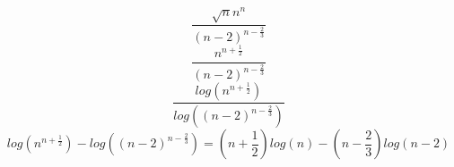 \begin{equation}
    \frac{\sqrt{n}n^n}{(n-2)^{n-\frac{2}{3}}} 
\end{equation}
\begin{equation}
    \frac{n^{n+\frac{1}{2}}}{(n-2)^{n-\frac{2}{3}}} 
\end{equation}
\begin{equation}
    \frac{log(n^{n+\frac{1}{2}})}{log((n-2)^{n-\frac{2}{3}})} 
\end{equation}
\begin{equation}
    log(n^{n+\frac{1}{2}}) - log((n-2)^{n-\frac{2}{3}}) =     (n+\frac{1}{2})log(n) - (n-\frac{2}{3})log(n-2)
\end{equation}
